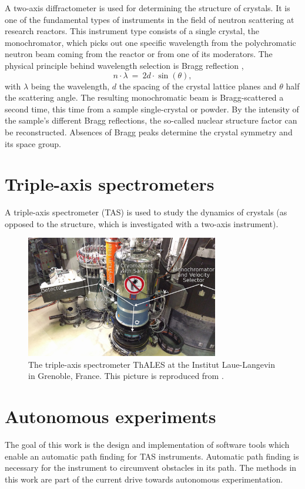 A two-axis diffractometer is used for determining the structure of crystals. It is one of the fundamental types of instruments in the field of neutron scattering at research reactors. This instrument type consists of a single crystal, the monochromator, which picks out one specific wavelength from the polychromatic neutron beam coming from the reactor or from one of its moderators. The physical principle behind wavelength selection is Bragg reflection \cite[p. 68]{Gross2012}, 
\begin{equation}
	n \cdot \lambda \ =\  2 d \cdot \sin\left(\theta\right),
\end{equation}
with $\lambda$ being the wavelength, $d$ the spacing of the crystal lattice planes and $\theta$ half the scattering angle.
The resulting monochromatic beam is Bragg-scattered a second time, this time from a sample single-crystal or powder. By the intensity of the sample's different Bragg reflections, the so-called nuclear structure factor can be reconstructed. Absences of Bragg peaks determine the crystal symmetry and its space group.



\section{Triple-axis spectrometers \label{sec:tas}}

A triple-axis spectrometer (TAS) is used to study the dynamics of crystals (as opposed to the structure, which is investigated with a two-axis instrument).



\clearpage
\begin{figure}[htb]
	\centering
	\includegraphics[width=0.75\textwidth]{figures/thales.jpg}
	\caption{The triple-axis spectrometer ThALES \cite{thales} at the Institut Laue-Langevin in Grenoble, France. This picture is reproduced from \cite{TODO}.}
	\label{fig:thales}
\end{figure}



\section{Autonomous experiments \label{sec:autonomous}}

The goal of this work is the design and implementation of software tools which enable an automatic path finding for TAS instruments.
Automatic path finding is necessary for the instrument to circumvent obstacles in its path. The methods in this work are part of the current drive towards autonomous experimentation.
